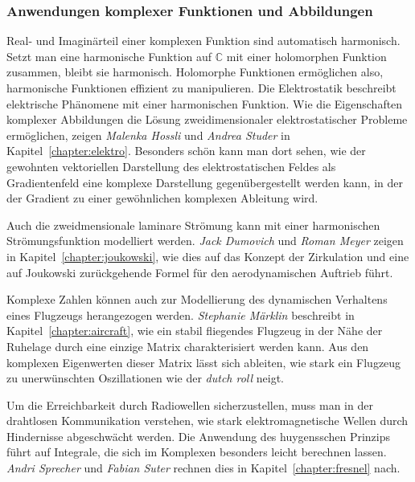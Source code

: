 %
%
\subsubsection{Anwendungen komplexer Funktionen und Abbildungen}

%
%
Real- und Imaginärteil einer komplexen Funktion sind automatisch
harmonisch.
Setzt man eine harmonische Funktion auf $\mathbb{C}$ mit einer
holomorphen Funktion zusammen, bleibt sie harmonisch.
Holomorphe Funktionen ermöglichen also, harmonische Funktionen
effizient zu manipulieren.
Die Elektrostatik beschreibt elektrische Phänomene mit einer
harmonischen Funktion.
Wie die Eigenschaften komplexer Abbildungen die Lösung
zweidimensionaler elektrostatischer Probleme ermöglichen, zeigen
\emph{Malenka Hossli}
%
%
und
\emph{Andrea Studer}
%
%
in Kapitel~\ref{chapter:elektro}.
Besonders schön kann man dort sehen, wie der gewohnten vektoriellen
Darstellung des elektrostatischen Feldes als Gradientenfeld eine komplexe
Darstellung gegenübergestellt werden kann, in der der Gradient zu einer
gewöhnlichen komplexen Ableitung wird.

%
%
Auch die zweidmensionale laminare Strömung kann mit einer harmonischen
Strömungsfunktion modelliert werden.
\emph{Jack Dumovich}
%
%
und
\emph{Roman Meyer}
%
%
zeigen in Kapitel~\ref{chapter:joukowski}, wie dies auf das Konzept
der Zirkulation und eine auf Joukowski zurückgehende Formel für den
aerodynamischen Auftrieb führt.

%
%
Komplexe Zahlen können auch zur Modellierung des dynamischen
Verhaltens eines Flugzeugs herangezogen werden.
\emph{Stephanie Märklin}
%
%
beschreibt in Kapitel~\ref{chapter:aircraft}, wie ein stabil fliegendes
Flugzeug in der Nähe der Ruhelage durch eine einzige Matrix charakterisiert
werden kann.
Aus den komplexen Eigenwerten dieser Matrix lässt sich ableiten, wie
stark ein Flugzeug zu unerwünschten Oszillationen wie der \emph{dutch roll}
neigt.

%
%
Um die Erreichbarkeit durch Radiowellen sicherzustellen, muss man
in der drahtlosen Kommunikation verstehen, wie stark elektromagnetische
Wellen durch Hindernisse abgeschwächt werden.
Die Anwendung des huygensschen Prinzips führt auf Integrale, die sich
im Komplexen besonders leicht berechnen lassen.
\emph{Andri Sprecher}
%
%
und
\emph{Fabian Suter}
%
%
rechnen dies in Kapitel~\ref{chapter:fresnel} nach.


